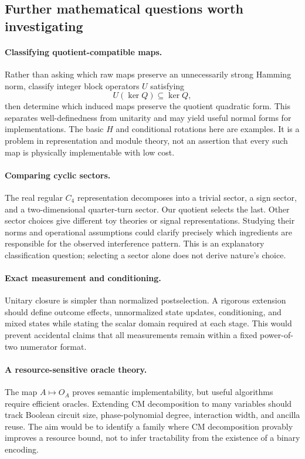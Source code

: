 \subsection{Further mathematical questions worth investigating}
\paragraph{Classifying quotient-compatible maps.}
Rather than asking which raw maps preserve an unnecessarily strong Hamming norm, classify integer block operators $U$ satisfying
\begin{equation}
 U(\ker Q)\subseteq\ker Q,
\end{equation}
then determine which induced maps preserve the quotient quadratic form. This separates well-definedness from unitarity and may yield useful normal forms for implementations. The basic $H$ and conditional rotations here are examples. It is a problem in representation and module theory, not an assertion that every such map is physically implementable with low cost.

\paragraph{Comparing cyclic sectors.}
The real regular $C_4$ representation decomposes into a trivial sector, a sign sector, and a two-dimensional quarter-turn sector. Our quotient selects the last. Other sector choices give different toy theories or signal representations. Studying their norms and operational assumptions could clarify precisely which ingredients are responsible for the observed interference pattern. This is an explanatory classification question; selecting a sector alone does not derive nature's choice.

\paragraph{Exact measurement and conditioning.}
Unitary closure is simpler than normalized postselection. A rigorous extension should define outcome effects, unnormalized state updates, conditioning, and mixed states while stating the scalar domain required at each stage. This would prevent accidental claims that all measurements remain within a fixed power-of-two numerator format.

\paragraph{A resource-sensitive oracle theory.}
The map $A\mapsto O_A$ proves semantic implementability, but useful algorithms require efficient oracles. Extending CM decomposition to many variables should track Boolean circuit size, phase-polynomial degree, interaction width, and ancilla reuse. The aim would be to identify a family where CM decomposition provably improves a resource bound, not to infer tractability from the existence of a binary encoding.


